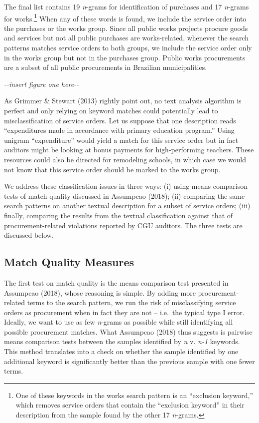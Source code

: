 \documentclass[]{article}
\let\rmarkdownfootnote\footnote%
\def\footnote{\protect\rmarkdownfootnote}
\theoremstyle{definition}
\theoremstyle{definition}
\theoremstyle{definition}
\theoremstyle{remark}
\begin{document}
The final list contains 19 \emph{n}-grams for identification of
purchases and 17 \emph{n}-grams for works.\footnote{One of these
  keywords in the works search pattern is an ``exclusion keyword,''
  which removes service orders that contain the ``exclusion keyword'' in
  their description from the sample found by the other 17
  \emph{n}-grams.} When any of these words is found, we include the
service order into the purchases or the works group. Since all public
works projects procure goods and services but not all public purchases
are works-related, whenever the search patterns matches service orders
to both groups, we include the service order only in the works group but
not in the purchases group. Public works procurements are a subset of
all public procurements in Brazilian municipalities.



\emph{-\/-insert figure one here-\/-}

As Grimmer \& Stewart (2013) rightly point out, no text analysis
algorithm is perfect and only relying on keyword matches could
potentially lead to misclassification of service orders. Let us suppose
that one description reads ``expenditures made in accordance with
primary education program.'' Using unigram ``expenditure'' would yield a
match for this service order but in fact auditors might be looking at
bonus payments for high-performing teachers. These resources could also
be directed for remodeling schools, in which case we would not know that
this service order should be marked to the works group.

We address these classification issues in three ways: (i) using means
comparison tests of match quality discussed in Assumpcao (2018); (ii)
comparing the same search patterns on another textual description for a
subset of service orders; (iii) finally, comparing the results from the
textual classification against that of procurement-related violations
reported by CGU auditors. The three tests are discussed below.

\hypertarget{quality1}{%
\subsection{Match Quality Measures}\label{quality1}}

The first test on match quality is the means comparison test presented
in Assumpcao (2018), whose reasoning is simple. By adding more
procurement-related terms to the search pattern, we run the risk of
misclassifying service orders as procurement when in fact they are not
-- i.e.~the typical type I error. Ideally, we want to use as few
\emph{n}-grams as possible while still identifying all possible
procurement matches. What Assumpcao (2018) thus suggests is pairwise
means comparison tests between the samples identified by \emph{n} v.
\emph{n-1} keywords. This method translates into a check on whether the
sample identified by one additional keyword is significantly better than
the previous sample with one fewer terms.
\end{document}
